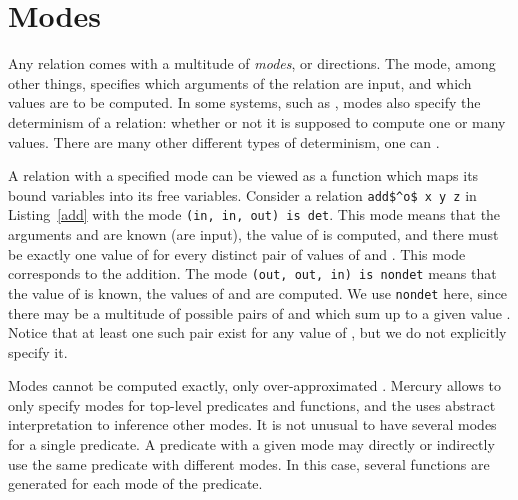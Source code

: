 \section{Modes}


Any relation comes with a multitude of \emph{modes}, or directions.
The mode, among other things, specifies which arguments of the relation are input, and which values are to be computed.
In some systems, such as \mercury, modes also specify the determinism of a relation: whether or not it is supposed to compute one or many values.
There are many other different types of determinism, one can .


A relation with a specified mode can be viewed as a function which maps its bound variables into its free variables.
Consider a relation \lstinline{add$^o$ x y z} in Listing~\ref{add} with the mode \lstinline{(in, in, out) is det}.
This mode means that the arguments \x and \y are known (are input), the value of \z is computed, and there must be exactly one value of \z for every distinct pair of values of \x and \y.
This mode corresponds to the addition.
The mode \lstinline{(out, out, in) is nondet} means that the value of \z is known, the values of \x and \y are computed.
We use \lstinline{nondet} here, since there may be a multitude of possible pairs of \x and \y which sum up to a given value \z.
Notice that at least one such pair exist for any value of \z, but we do not explicitly specify it.

Modes cannot be computed exactly, only over-approximated .
Mercury allows to only specify modes for top-level predicates and functions, and the uses abstract interpretation to inference other modes.
It is not unusual to have several modes for a single predicate.
A predicate with a given mode may directly or indirectly use the same predicate with different modes.
In this case, several functions are generated for each mode of the predicate.
